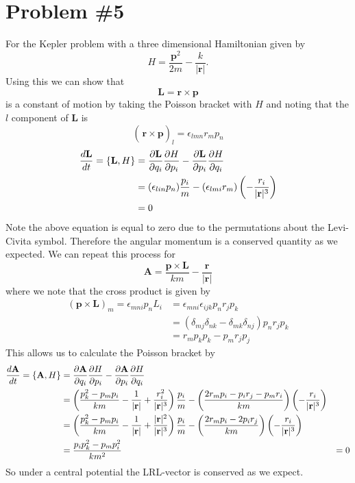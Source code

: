\documentclass[11pt]{article}
\numberwithin{equation}{section}
\begin{document}
\section{Problem \#5}
For the Kepler problem with a three dimensional Hamiltonian given by
$$H = \frac{\mathbf{p}^2}{2m} - \frac{k}{|\mathbf{r}|}.$$
Using this we can show that 
$$\mathbf{L} = \mathbf{r}\times\mathbf{p}$$
is a constant of motion by taking the Poisson bracket with $H$ and noting that the $l$ 
component of $\mathbf{L}$ is
$$\left(\frac{}{}\mathbf{r}\times\mathbf{p}\right)_{l} = \epsilon_{lmn}r_mp_n$$
\begin{align*}
\frac{d\mathbf{L}}{dt} = \{\mathbf{L},H\} &= \frac{\partial{\mathbf{L}}}{\partial{q_i}}\frac{\partial{H}}{\partial{p_i}} - \frac{\partial{\mathbf{L}}}{\partial{p_i}}\frac{\partial{H}}{\partial{q_i}}\\
&= (\epsilon_{lin}p_n)\frac{p_i}{m} - (\epsilon_{lmi}r_m)\left(-\frac{r_i}{|\mathbf{r}|^3}\right)\\
&= 0
\end{align*}
Note the above equation is equal to zero due to the permutations about the Levi-Civita 
symbol. Therefore the angular momentum is a conserved quantity as we expected. We can repeat
this process for 
$$\mathbf{A} = \frac{\mathbf{p}\times\mathbf{L}}{km} - \frac{\mathbf{r}}{|\mathbf{r}|}$$
where we note that the cross product is given by
\begin{align*}
(\mathbf{p}\times\mathbf{L})_m = \epsilon_{mni}p_nL_i &= \epsilon_{mni}\epsilon_{ijk}p_nr_jp_k \\
&= (\delta_{mj}\delta_{nk}-\delta_{mk}\delta_{nj})p_nr_jp_k\\
&= r_mp_kp_k - p_mr_jp_j
\end{align*}
This allows us to calculate the Poisson bracket by
\begin{align*}
\frac{d\mathbf{A}}{dt} = \{\mathbf{A},H\}  &= \frac{\partial{\mathbf{A}}}{\partial{q_i}}\frac{\partial{H}}{\partial{p_i}} - \frac{\partial{\mathbf{A}}}{\partial{p_i}}\frac{\partial{H}}{\partial{q_i}}\\
&= \left(\frac{p_k^2-p_mp_i}{km} - \frac{1}{|\mathbf{r}|} + \frac{r_i^2}{|\mathbf{r}|^3}\right)\frac{p_i}{m} - \left(\frac{2r_mp_i-p_ir_j-p_mr_i}{km}\right)\left(-\frac{r_i}{|\mathbf{r}|^3}\right)\\
&= \left(\frac{p_k^2-p_mp_i}{km} - \frac{1}{|\mathbf{r}|} + \frac{|\mathbf{r}|^2}{|\mathbf{r}|^3}\right)\frac{p_i}{m} - \left(\frac{2r_mp_i-2p_ir_j}{km}\right)\left(-\frac{r_i}{|\mathbf{r}|^3}\right)\\
&= \frac{p_ip_k^2-p_mp_i^2}{km^2} 
&= 0
\end{align*}
So under a central potential the LRL-vector is conserved as we expect.
\end{document}
